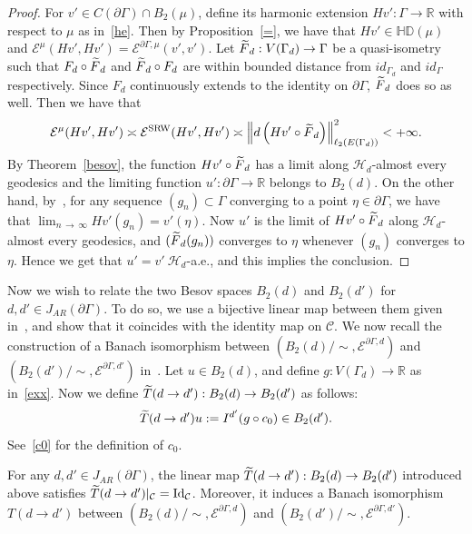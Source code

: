 \documentclass[AHL,Unicode,longabstracts,published]{cedram}
\newcommand{\ce}{\mathcal{E}}
\newcommand{\ch}{\mathcal{H}}
\newcommand{\cC}{\mathcal{C}}
\newcommand{\br}{\mathbb{R}}
\newcommand{\bHD}{\mathbb{HD}}
\newcommand{\SRW}{\mathrm{SRW}}
\newcommand{\rmId}{\mathrm{Id}}
\let\oldtilde\tilde
\renewcommand*{\tilde}[1]{\mathchoice{\widetilde{#1}}{\widetilde{#1}}{\oldtilde{#1}}{\oldtilde{#1}}}
\begin{document}
\begin{proof}
For $v'\in C(\partial\Gamma)\cap B_2(\mu)$, define its harmonic extension $Hv':\Gamma\rightarrow\br$ with respect to $\mu$ as in~\eqref{he}. Then by Proposition~\ref{=}, we have that $Hv'\in\bHD(\mu)$ and $\ce^{\mu}(Hv',Hv')=\ce^{\partial\Gamma,\mu}(v',v')$. Let $\tilde{F}_{d}:V(\Gamma_{d})\rightarrow\Gamma$ be a quasi-isometry such that $F_{d}\circ\tilde{F}_{d}$ and $\tilde{F}_{d}\circ F_{d}$ are within bounded distance from $id_{\Gamma_{d}}$ and $id_{\Gamma}$ respectively. Since $F_{d}$ continuously extends to the identity on $\partial\Gamma$, $\tilde{F}_{d}$ does so as well. Then we have that
\begin{align*}
\ce^{\mu}(Hv',Hv')\asymp \ce^{\SRW}(Hv',Hv')\asymp
\left\|d\left(Hv'\circ \tilde{F}_{d}\right)\right\|^2_{\ell_2(E(\Gamma_{d}))}<+\infty.
\end{align*}
By Theorem~\ref{besov}, the function $Hv'\circ \tilde{F}_{d}$ has a limit along $\ch_{d}$-almost every geodesics and the limiting function $u':\partial \Gamma\rightarrow\br$ belongs to $B_2(d)$. On the other hand, by~\cite[Lemma~2.2]{Ka}, for any sequence $(g_n)\subset\Gamma$ converging to a point $\eta\in\partial\Gamma$, we have that $\lim_{n\,\to\,\infty}Hv'(g_n)=v'(\eta)$. Now $u'$ is the limit of $Hv'\circ \tilde{F}_{d}$ along $\ch_{d}$-almost every geodesics, and $(\tilde{F}_{d}(g_n))$ converges to $\eta$ whenever $(g_n)$ converges to $\eta$. Hence we get that $u'=v'\ \ch_{d}$-a.e., and this implies the conclusion.
\end{proof}

Now we wish to relate the two Besov spaces $B_2(d)$ and $B_2(d')$ for $d,d'\in J_{AR}(\partial\Gamma)$. To do so, we use a bijective linear map between them given in~\cite{BP}, and show that it coincides with the identity map on $\cC$. We now recall the construction of a Banach isomorphism between $(B_2(d)/\sim,\ce^{\partial\Gamma,d})$ and $(B_2(d')/\sim,\ce^{\partial\Gamma,d'})$ in~\cite{BP}. Let $u\in B_2(d)$, and define $g:V(\Gamma_{d})\rightarrow\br$ as in~\eqref{exx}. Now we define $\tilde{T}(d\to d'):B_2(d)
\rightarrow B_2(d')
$ as follows:
\[
\tilde{T}(d\to d')u:=I^{d'}(g\circ c_0)\in B_2(d').
\]
See~\eqref{c0} for the definition of $c_0$.

\begin{lemm}\label{nap}
For any $d,d'\in J_{AR}(\partial\Gamma)$, the linear map $\tilde{T}(d\to d'):B_2(d) \to B_2(d')$ introduced above satisfies $\tilde{T}(d\to d')|_{\cC}=\rmId_{\cC}$. Moreover, it induces a Banach isomorphism $T(d\to d')$ between $(B_2(d)/\sim,\ce^{\partial\Gamma,d})$ and $(B_2(d')/\sim,\ce^{\partial\Gamma,d'})$.
\end{lemm}
\end{document}
